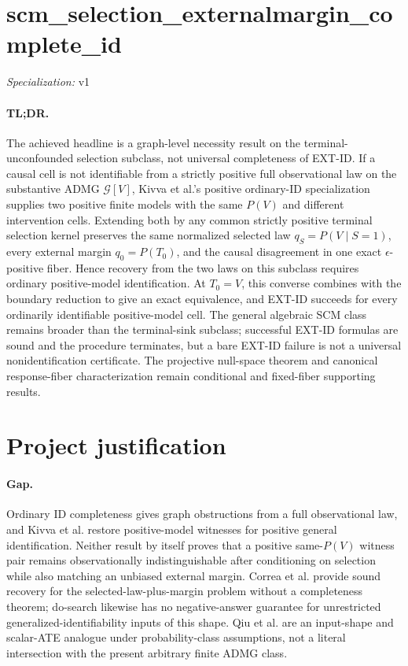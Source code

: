\documentclass{article}
\begin{document}
\sloppy

\section*{scm\_\allowbreak{}selection\_\allowbreak{}externalmargin\_\allowbreak{}complete\_\allowbreak{}id}

\noindent\textit{Specialization:} v1\par

\paragraph{TL;DR.} The achieved headline is a graph-level necessity result on the terminal-unconfounded selection subclass, not universal completeness of EXT-ID. If a causal cell is not identifiable from a strictly positive full observational law on the substantive ADMG \(\mathcal G[V]\), Kivva et al.'s positive ordinary-ID specialization supplies two positive finite models with the same \(P(V)\) and different intervention cells. Extending both by any common strictly positive terminal selection kernel preserves the same normalized selected law \(q_S=P(V\mid S=1)\), every external margin \(q_0=P(T_0)\), and the causal disagreement in one exact \(\epsilon\)-positive fiber. Hence recovery from the two laws on this subclass requires ordinary positive-model identification. At \(T_0=V\), this converse combines with the boundary reduction to give an exact equivalence, and EXT-ID succeeds for every ordinarily identifiable positive-model cell. The general algebraic SCM class remains broader than the terminal-sink subclass; successful EXT-ID formulas are sound and the procedure terminates, but a bare EXT-ID failure is not a universal nonidentification certificate. The projective null-space theorem and canonical response-fiber characterization remain conditional and fixed-fiber supporting results.

\section{Project justification}

\paragraph{Gap.} Ordinary ID completeness gives graph obstructions from a full observational law, and Kivva et al. restore positive-model witnesses for positive general identification. Neither result by itself proves that a positive same-\(P(V)\) witness pair remains observationally indistinguishable after conditioning on selection while also matching an unbiased external margin. Correa et al. provide sound recovery for the selected-law-plus-margin problem without a completeness theorem; do-search likewise has no negative-answer guarantee for unrestricted generalized-identifiability inputs of this shape. Qiu et al. are an input-shape and scalar-ATE analogue under probability-class assumptions, not a literal intersection with the present arbitrary finite ADMG class.
\end{document}
